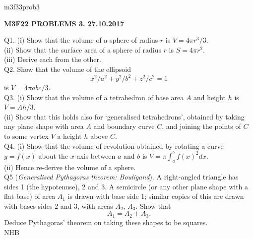 \documentclass[12pt]{article}
\begin{document}
\def\R{\mathbb{R}}
\def\C{\mathbb{C}}
\def\Z{\mathbb{Z}}
\def\N{\mathbb{N}}
\def\Q{\mathbb{Q}}
\def\D{\mathbb{D}}
\def\Sp{{\mathbb{S}}}
\def\T{\mathbb{T}}
\def\H{\mathbb{H}}
\def\hb{\hfil \break}
\def\ni{\noindent}
\def\i{\indent}
\def\a{\alpha}
\def\b{\beta}
\def\e{\epsilon}
\def\d{\delta}
\def\D{\Delta}
\def\G{\Gamma}
\def\g{\gamma}
\def\l{\lambda}
\def\m{\mu}
\def\s{\sigma}
\def\Si{\Sigma}
\def\th{\theta}
\def\z{\zeta}
\def\p{\partial}
\def\o{\omega}
\def\O{\Omega}
\def\t{\tau}
\def\L{\it \char'44}
\def\F{\mathcal{F}}
\def\B{\mathcal{B}}
\def\C{\mathcal{C}}
\def\half{\frac{1}{2}}
\ni m3f33prob3 \\
\begin{center}
{\bf M3F22 PROBLEMS 3.  27.10.2017} 
\end{center}
\ni Q1.  (i) Show that the volume of a sphere of radius $r$ is $V = 4 \pi r^3/3$. \\
(ii) Show that the surface area of a sphere of radius $r$ is $S = 4 \pi r^2$. \\
(iii) Derive each from the other. \\

\ni Q2.  Show that the volume of the ellipsoid
$$
x^2/a^2 + y^2/b^2 + z^2/c^2 = 1
$$
is $V = 4 \pi abc/3$.\\

\ni Q3. (i) Show that the volume of a tetrahedron of base area $A$ and height $h$ is $V = A h/3$. \\
(ii) Show that this holds also for `generalised tetrahedrons', obtained by taking any plane shape with area $A$ and boundary curve $C$, and joining the points of $C$ to some vertex $V$ a height $h$ above $C$. \\

\ni Q4. (i) Show that the volume of revolution obtained by rotating a curve $y = f(x)$ about the $x$-axis between $a$ and $b$ is $V = \pi \int_a^b f(x)^2 dx$. \\
(ii) Hence re-derive the volume of a sphere. \\

\ni Q5 ({\it Generalised Pythagoras theorem: Bouligand}).  A right-angled triangle has sides 1 (the hypotenuse), 2 and 3.  A semicircle (or any other plane shape with a flat base) of area $A_1$ is drawn with base side 1; similar copies of this are drawn with bases sides 2 and 3, with areas $A_2$, $A_3$.  Show that
$$
A_1 = A_2 + A_3.
$$
Deduce Pythagoras' theorem on taking these shapes to be squares. \\

\hfil NHB \break
\end{document}
